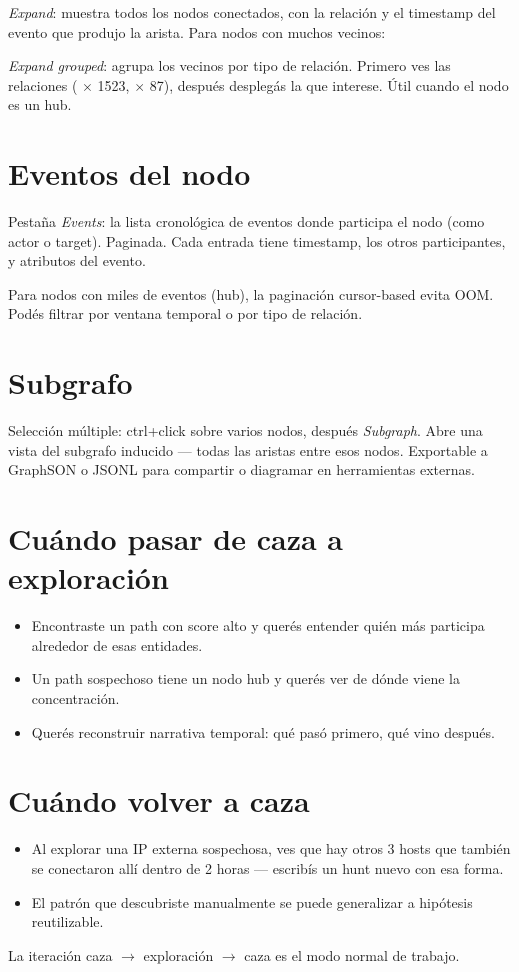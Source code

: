 \emph{Expand}: muestra todos los nodos conectados, con la relación
y el timestamp del evento que produjo la arista. Para nodos con
muchos vecinos:

\emph{Expand grouped}: agrupa los vecinos por tipo de relación.
Primero ves las relaciones ( $\times$ 1523,
 $\times$ 87), después desplegás la que interese. Útil
cuando el nodo es un hub.

\section{Eventos del nodo}

Pestaña \emph{Events}: la lista cronológica de eventos donde
participa el nodo (como actor o target). Paginada. Cada entrada
tiene timestamp, los otros participantes, y atributos del evento.

Para nodos con miles de eventos (hub), la paginación cursor-based
evita OOM. Podés filtrar por ventana temporal o por tipo de
relación.

\section{Subgrafo}

Selección múltiple: ctrl+click sobre varios nodos, después
\emph{Subgraph}. Abre una vista del subgrafo inducido — todas las
aristas entre esos nodos. Exportable a GraphSON o JSONL para
compartir o diagramar en herramientas externas.

\section{Cuándo pasar de caza a exploración}

\begin{itemize}
    \item Encontraste un path con score alto y querés entender
    quién más participa alrededor de esas entidades.
    \item Un path sospechoso tiene un nodo hub y querés ver de dónde
    viene la concentración.
    \item Querés reconstruir narrativa temporal: qué pasó primero,
    qué vino después.
\end{itemize}

\section{Cuándo volver a caza}

\begin{itemize}
    \item Al explorar una IP externa sospechosa, ves que hay otros
    3 hosts que también se conectaron allí dentro de 2 horas —
    escribís un hunt nuevo con esa forma.
    \item El patrón que descubriste manualmente se puede generalizar
    a hipótesis reutilizable.
\end{itemize}

La iteración caza $\to$ exploración $\to$ caza es el modo normal
de trabajo.

